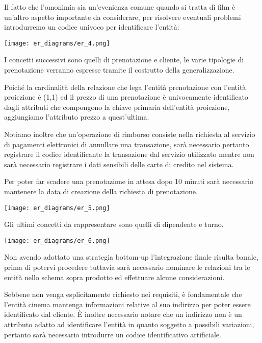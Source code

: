 Il fatto che l'omonimia sia un'evenienza comune quando si tratta di film
è un'altro aspetto importante da considerare, per risolvere eventuali problemi
introdurremo un codice univoco per identificare l'entità:

\begin{center}
    \texttt{[image: er\_diagrams/er\_4.png]}
\end{center}

\pagebreak

I concetti successivi sono quelli di prenotazione e cliente, le varie tipologie
di prenotazione verranno espresse tramite il costrutto della generalizzazione.

Poiché la cardinalità della relazione che lega l'entità prenotazione con
l'entità proiezione è (1,1) ed il prezzo di una prenotazione è univocamente
identificato dagli attributi che compongono la chiave primaria dell'entità
proiezione, aggiungiamo l'attributo prezzo a quest'ultima.

Notiamo inoltre che un'operazione di rimborso consiste nella richiesta al
servizio di pagamenti elettronici di annullare una transazione, sarà necessario
pertanto registrare il codice identificante la transazione dal servizio
utilizzato mentre non sarà necessario registrare i dati sensibili delle carte
di credito nel sistema.

Per poter far scadere una prenotazione in attesa dopo 10 minuti sarà necessario
mantenere la data di creazione della richiesta di prenotazione.

\begin{center}
    \texttt{[image: er\_diagrams/er\_5.png]}
\end{center}

\pagebreak

Gli ultimi concetti da rappresentare sono quelli di dipendente e turno.

\texttt{[image: er\_diagrams/er\_6.png]}

Non avendo adottato una strategia bottom-up l'integrazione finale risulta
banale, prima di potervi procedere tuttavia sarà necessario nominare le
relazioni tra le entità nello schema sopra prodotto ed effettuare alcune
considerazioni.

Sebbene non venga esplicitamente richiesto nei requisiti, è fondamentale che
l'entità cinema mantenga informazioni relative al suo indirizzo per poter
essere identificato dal cliente.
È inoltre necessario notare che un indirizzo non è un attributo adatto ad
identificare l'entità in quanto soggetto a possibili variazioni, pertanto
sarà necessario introdurre un codice identificativo artificiale.

